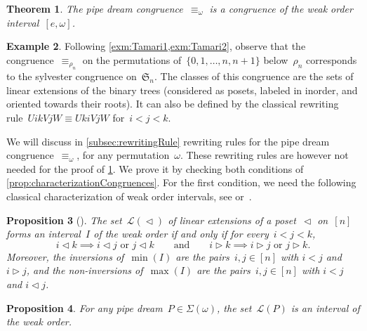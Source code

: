\documentclass{amsart}
\newtheorem{theorem}{Theorem}[section]
\newtheorem{proposition}[theorem]{Proposition}
\theoremstyle{definition}
\newtheorem{example}[theorem]{Example}
\newcommand{\fS}{\mathfrak{S}} %
\newcommand{\acyclicPipeDreams}{\Sigma} %
\newcommand{\linearExtensions}{\mathcal{L}} %
\newcommand{\less}{\vartriangleleft} %
\newcommand{\more}{\vartriangleright} %
\begin{document}
\begin{theorem}
\label{thm:pipeDreamCongruence}
The pipe dream congruence~$\equiv_\omega$ is a congruence of the weak order interval~$[e,\omega]$.
\end{theorem}

\begin{example}
\label{exm:Tamari3}
Following \cref{exm:Tamari1,exm:Tamari2}, observe that the congruence~$\equiv_{\rho_n}$ on the permutations of~$\{0, 1, \dots, n, n+1\}$ below~$\rho_n$ corresponds to the sylvester congruence on~$\fS_n$.
The classes of this congruence are the sets of linear extensions of the binary trees (considered as posets, labeled in inorder, and oriented towards their roots).
It can also be defined by the classical rewriting rule~$UikVjW \equiv UkiVjW$ for~$i < j < k$.
\end{example}

We will discuss in \cref{subsec:rewritingRule} rewriting rules for the pipe dream congruence~$\equiv_\omega$, for any permutation~$\omega$.
These rewriting rules are however not needed for the proof of \cref{thm:pipeDreamCongruence}.
We prove it by checking both conditions of \cref{prop:characterizationCongruences}.
For the first condition, we need the following classical characterization of weak order intervals, see \cite{BjornerWachs} or~\cite{ChatelPilaudPons}.

\begin{proposition}[{\cite[Thm.~6.8]{BjornerWachs}}]
\label{prop:WOIP}
The set~$\linearExtensions(\less)$ of linear extensions of a poset~$\less$ on~$[n]$ forms an interval~$I$ of the weak order if and only if for every~$i < j < k$,
\[
i \less k \implies i \less j \text{ or } j \less k
\qquad\text{and}\qquad
i \more k \implies i \more j \text{ or } j \more k.
\]
Moreover, the inversions of~$\min(I)$ are the pairs~$i,j \in [n]$ with $i < j$ and $i \more j$, and the non-inversions of~$\max(I)$ are the pairs~$i,j \in [n]$ with $i < j$ and $i \less j$.
\end{proposition}

\begin{proposition}
\label{prop:intervals}
For any pipe dream~$P \in \acyclicPipeDreams(\omega)$, the set~$\linearExtensions(P)$ is an interval of the weak order.
\end{proposition}
\end{document}
